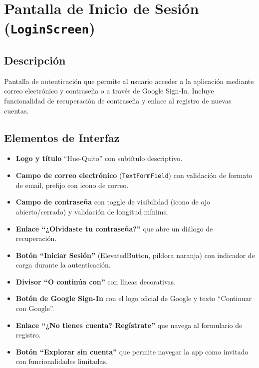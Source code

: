 \documentclass[11pt, a4paper, oneside]{report}
\begin{document}
\section{Pantalla de Inicio de Sesión (\texttt{LoginScreen})}

\subsection{Descripción}
Pantalla de autenticación que permite al usuario acceder a la aplicación mediante correo electrónico y contraseña o a través de Google Sign-In. Incluye funcionalidad de recuperación de contraseña y enlace al registro de nuevas cuentas.

\subsection{Elementos de Interfaz}
\begin{itemize}
  \item \textbf{Logo y título} ``Hue-Quito'' con subtítulo descriptivo.
  \item \textbf{Campo de correo electrónico} (\texttt{TextFormField}) con validación de formato de email, prefijo con icono de correo.
  \item \textbf{Campo de contraseña} con toggle de visibilidad (icono de ojo abierto/cerrado) y validación de longitud mínima.
  \item \textbf{Enlace ``¿Olvidaste tu contraseña?''} que abre un diálogo de recuperación.
  \item \textbf{Botón ``Iniciar Sesión''} (ElevatedButton, píldora naranja) con indicador de carga durante la autenticación.
  \item \textbf{Divisor ``O continúa con''} con líneas decorativas.
  \item \textbf{Botón de Google Sign-In} con el logo oficial de Google y texto ``Continuar con Google''.
  \item \textbf{Enlace ``¿No tienes cuenta? Regístrate''} que navega al formulario de registro.
  \item \textbf{Botón ``Explorar sin cuenta''} que permite navegar la app como invitado con funcionalidades limitadas.
\end{itemize}
\end{document}

